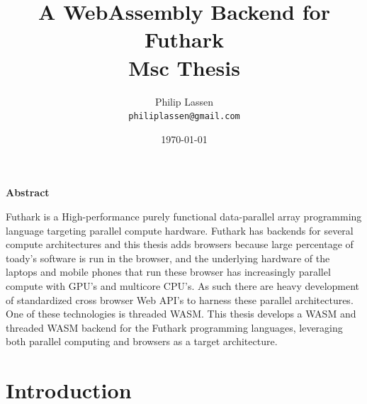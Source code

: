 \documentclass[11pt]{book}
\title{
  \vspace{3cm}
  \Huge{A WebAssembly Backend for Futhark} \\
  \Large{Msc Thesis}
}
\author{
  \Large{Philip Lassen}
  \\ \texttt{philiplassen@gmail.com} \\
}
\date{
    \today
}
\def \ColourPDF {include/natbio-farve}
\def \TitlePDF   {include/nat-en}  %
\begin{document}


\clearpage\maketitle
\thispagestyle{empty}

\newpage
\begin{center}
    \textbf{Abstract}
\end{center}

Futhark is a High-performance purely functional data-parallel array programming language targeting parallel compute hardware. Futhark has backends for several  compute architectures  and this thesis adds browsers because large percentage of toady's software is run in the browser, and the underlying hardware of the laptops and mobile phones that run these browser has increasingly parallel compute with GPU's and multicore CPU's. As such there are heavy development of standardized cross browser Web API's to harness these parallel architectures. One of these technologies is threaded WASM. This thesis develops a WASM and threaded WASM backend for the Futhark programming languages, leveraging both parallel computing and browsers as a target architecture.  




\tableofcontents



\chapter{Introduction}
\end{document}
